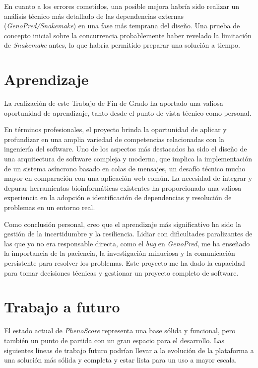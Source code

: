 En cuanto a los errores cometidos, una posible mejora habría sido realizar un análisis técnico más detallado de las dependencias externas (\textit{GenoPred/Snakemake}) en una fase más temprana del diseño. Una prueba de concepto inicial sobre la concurrencia probablemente haber revelado la limitación de \textit{Snakemake} antes, lo que habría permitido preparar una solución a tiempo.

\section{Aprendizaje}

La realización de este Trabajo de Fin de Grado ha aportado una valiosa oportunidad de aprendizaje, tanto desde el punto de vista técnico como personal. 

En términos profesionales, el proyecto brinda la oportunidad de aplicar y profundizar en una amplia variedad de competencias relacionadas con la ingeniería del software. Uno de los aspectos más destacados ha sido el diseño de una arquitectura de software compleja y moderna, que implica la implementación de un sistema asíncrono basado en colas de mensajes, un desafío técnico mucho mayor en comparación con una aplicación web común. La necesidad de integrar y depurar herramientas bioinformáticas existentes ha proporcionado una valiosa experiencia en la adopción e identificación de dependencias y resolución de problemas en un entorno real.

Como conclusión personal, creo que el aprendizaje más significativo ha sido la gestión de la incertidumbre y la resiliencia. Lidiar con dificultades paralizantes de las que yo no era responsable directa, como el \textit{bug} en \textit{GenoPred}, me ha enseñado la importancia de la paciencia, la investigación minuciosa y la comunicación persistente para resolver los problemas. Este proyecto me ha dado la capacidad para tomar decisiones técnicas y gestionar un proyecto completo de software.

\section{Trabajo a futuro}
El estado actual de \textit{PhenoScore} representa una base sólida y funcional, pero también un punto de partida con un gran espacio para el desarrollo. Las siguientes líneas de trabajo futuro podrían llevar a la evolución de la plataforma a una solución más sólida y completa y estar lista para un uso a mayor escala.

